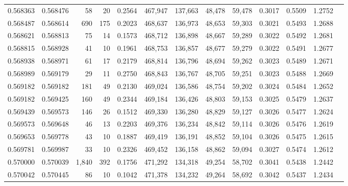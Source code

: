 \begin{tabular}{rrrrrrrrrrrrr}
0.568363 & 0.568476 &    58 &  20 &                                     0.2564 & 467,947 & 137,663 &  48,478 &  59,478 & 0.3017 & 0.5509 & 1.2752 \\
0.568487 & 0.568614 &   690 & 175 &                                     0.2023 & 468,637 & 136,973 &  48,653 &  59,303 & 0.3021 & 0.5493 & 1.2688 \\
0.568621 & 0.568813 &    75 &  14 &                                     0.1573 & 468,712 & 136,898 &  48,667 &  59,289 & 0.3022 & 0.5492 & 1.2681 \\
0.568815 & 0.568928 &    41 &  10 &                                     0.1961 & 468,753 & 136,857 &  48,677 &  59,279 & 0.3022 & 0.5491 & 1.2677 \\
0.568938 & 0.568971 &    61 &  17 &                                     0.2179 & 468,814 & 136,796 &  48,694 &  59,262 & 0.3023 & 0.5489 & 1.2671 \\
0.568989 & 0.569179 &    29 &  11 &                                     0.2750 & 468,843 & 136,767 &  48,705 &  59,251 & 0.3023 & 0.5488 & 1.2669 \\
0.569182 & 0.569182 &   181 &  49 &                                     0.2130 & 469,024 & 136,586 &  48,754 &  59,202 & 0.3024 & 0.5484 & 1.2652 \\
0.569182 & 0.569425 &   160 &  49 &                                     0.2344 & 469,184 & 136,426 &  48,803 &  59,153 & 0.3025 & 0.5479 & 1.2637 \\
0.569439 & 0.569573 &   146 &  26 &                                     0.1512 & 469,330 & 136,280 &  48,829 &  59,127 & 0.3026 & 0.5477 & 1.2624 \\
0.569573 & 0.569648 &    46 &  13 &                                     0.2203 & 469,376 & 136,234 &  48,842 &  59,114 & 0.3026 & 0.5476 & 1.2619 \\
0.569653 & 0.569778 &    43 &  10 &                                     0.1887 & 469,419 & 136,191 &  48,852 &  59,104 & 0.3026 & 0.5475 & 1.2615 \\
0.569781 & 0.569987 &    33 &  10 &                                     0.2326 & 469,452 & 136,158 &  48,862 &  59,094 & 0.3027 & 0.5474 & 1.2612 \\
0.570000 & 0.570039 & 1,840 & 392 &                                     0.1756 & 471,292 & 134,318 &  49,254 &  58,702 & 0.3041 & 0.5438 & 1.2442 \\
0.570042 & 0.570445 &    86 &  10 &                                     0.1042 & 471,378 & 134,232 &  49,264 &  58,692 & 0.3042 & 0.5437 & 1.2434 \\

\end{tabular}
